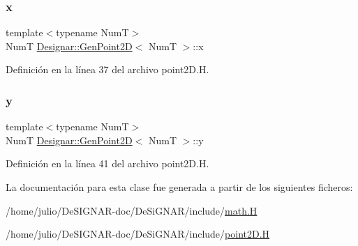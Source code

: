 \subsubsection{\texorpdfstring{x}{x}}
{\footnotesize\ttfamily template$<$typename NumT$>$ \\
NumT \hyperlink{class_designar_1_1_gen_point2_d}{Designar\+::\+Gen\+Point2D}$<$ NumT $>$\+::x\hspace{0.3cm}{\ttfamily [protected]}}



Definición en la línea 37 del archivo point2\+D.\+H.

\mbox{\label{class_designar_1_1_gen_point2_d_a89aada53ecce4e14878c1a97843ed2d2}} 
\subsubsection{\texorpdfstring{y}{y}}
{\footnotesize\ttfamily template$<$typename NumT$>$ \\
NumT \hyperlink{class_designar_1_1_gen_point2_d}{Designar\+::\+Gen\+Point2D}$<$ NumT $>$\+::y\hspace{0.3cm}{\ttfamily [protected]}}



Definición en la línea 41 del archivo point2\+D.\+H.



La documentación para esta clase fue generada a partir de los siguientes ficheros\+:\begin{DoxyCompactItemize}
\item 
/home/julio/\+De\+S\+I\+G\+N\+A\+R-\/doc/\+De\+Si\+G\+N\+A\+R/include/\hyperlink{math_8_h}{math.\+H}\item 
/home/julio/\+De\+S\+I\+G\+N\+A\+R-\/doc/\+De\+Si\+G\+N\+A\+R/include/\hyperlink{point2_d_8_h}{point2\+D.\+H}\end{DoxyCompactItemize}
